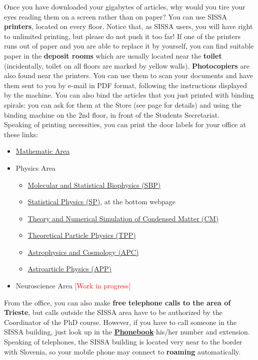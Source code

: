 \documentclass{sissavademecum}
\begin{document}
Once you have downloaded your gigabytes of articles, why would you tire your eyes reading them on a screen rather than on paper? You can use SISSA \textbf{printers}, located on every floor. Notice that, as SISSA users, you will have right to unlimited printing, but please do not push it too far! If one of the printers runs out of paper and you are able to replace it by yourself, you can find suitable paper in the \textbf{deposit rooms} which are usually located near the \textbf{toilet} (incidentally, toilet on all floors are marked by yellow walls). \textbf{Photocopiers} are also found near the printers. You can use them to scan your documents and have them sent to you by e-mail in PDF format, following the instructions displayed by the machine. You can also bind the articles that you just printed with binding spirals: you can ask for them at the Store (see page \pageref{sec:Store} for details) and using the binding machine on the 2nd floor, in front of the Students Secretariat. \\
Speaking of printing necessities, you can print the door labels for your office at these links:
\begin{itemize}
	\item \href{https://www.math.sissa.it/content/door-label}{Mathematic Area}
	\item Physics Area
		\begin{itemize}
			\item \href{https://www.sissa.it/sbp/webtools/doorlabel/door.php}{Molecular and Statistical Biophysics  (SBP)}
			\item \href{https://www.statphys.sissa.it/wordpress/?page_id=1684}{Statistical Physics (SP)}, at the bottom webpage
			\item \href{https://drive.google.com/open?id=1cXeavsXzdJGx8aPpN6UYXrCZ6yoPBbuA}{Theory and Numerical Simulation of Condensed Matter (CM)}
			\item \href{https://www.sissa.it/tpp/webtools/doorlabel/door.php}{Theoretical Particle Physics (TPP)}
			\item \href{https://www.sissa.it/ap/webtools/doorlabel/door.php}{Astrophysics and Cosmology (APC)}
			\item \href{https://www.sissa.it/app/webtools/doorlabel/door.php}{Astroarticle Physics (APP)}
		\end{itemize}
	\item Neuroscience Area \textcolor{red}{[Work in progress]}
\end{itemize} 

From the office, you can also make \textbf{free telephone calls to the area of Trieste}, but calls outside the SISSA area have to be authorized by the Coordinator of the PhD course. However, if you have to call someone in the SISSA building, just look up in the \href{http://services.sissa.it/phonebook/index.php?r=site/people}{\textbf{Phonebook}} his/her number and extension. Speaking of telephones, the SISSA building is located very near to the border with Slovenia, so your mobile phone may connect to \textbf{roaming} automatically.
\end{document}
